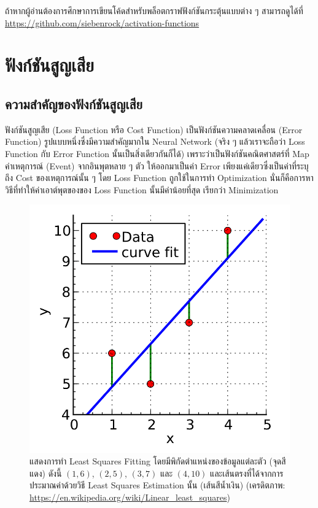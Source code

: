 ถ้าหากผู้อ่านต้องการศึกษาการเขียนโค้ดสำหรับพล็อตกราฟฟังก์ชันกระตุ้นแบบต่าง ๆ สามารถดูได้ที่
\url{https://github.com/siebenrock/activation-functions}

\section{ฟังก์ชันสูญเสีย}
\label{sec:loss_func}

\subsection{ความสำคัญของฟังก์ชันสูญเสีย}
\label{ssec:why_loss_func}

ฟังก์ชันสูญเสีย (Loss Function หรือ Cost Function) เป็นฟังก์ชันความคลาดเคลื่อน (Error Function) รูปแบบหนึ่งซึ่งมีความสำคัญมากใน
Neural Network (จริง ๆ แล้วเราจะถือว่า Loss Function กับ Error Function นั้นเป็นสิ่งเดียวกันก็ได้) เพราะว่าเป็นฟังก์ชันคณิตศาสตร์ที่
Map ค่าเหตุการณ์ (Event) จากอินพุตหลาย ๆ ตัว ให้ออกมาเป็นค่า Error เพียงแค่เดียวซึ่งเป็นค่าที่ระบุถึง Cost ของเหตุการณ์นั้น ๆ โดย Loss
Function ถูกใช้ในการทำ Optimization นั่นก็คือการหาวิธีที่ทำให้ค่าเอาต์พุตของของ Loss Function นั้นมีค่าน้อยที่สุด เรียกว่า Minimization

\begin{figure}[H]
    \centering
    \includegraphics[width=0.7\linewidth]{fig/least-squares-fitting.png}
    \caption{แสดงการทำ Least Squares Fitting โดยมีพิกัดตำแหน่งของข้อมูลแต่ละตัว (จุดสีแดง) ดังนี้ $(1,6)$, $(2,5)$, $(3,7)$
        และ $(4,10)$ และเส้นตรงที่ได้จากการประมาณค่าด้วยวิธี Least Squares Estimation นั้น (เส้นสีน้ำเงิน) (เครดิตภาพ:
        \url{https://en.wikipedia.org/wiki/Linear_least_squares})}
    \label{fig:least_square_fitting}
\end{figure}

